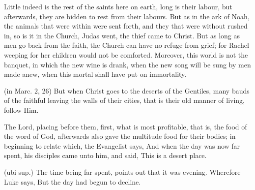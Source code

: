  Little indeed is the rest of the saints here on earth, long is their labour, but afterwards, they are bidden to rest from their labours. But as in the ark of Noah, the animals that were within were sent forth, and they that were without rushed in, so is it in the Church, Judas went, the thief came to Christ. But as long as men go back from the faith, the Church can have no refuge from grief; for Rachel weeping for her children would not be comforted. Moreover, this world is not the banquet, in which the new wine is drank, when the new song will be sung by men made anew, when this mortal shall have put on immortality.

 (in Marc. 2, 26) But when Christ goes to the deserts of the Gentiles, many bauds of the faithful leaving the walls of their cities, that is their old manner of living, follow Him.

 

 The Lord, placing before them, first, what is most profitable, that is, the food of the word of God, afterwards also gave the multitude food for their bodies; in beginning to relate which, the Evangelist says, And when the day was now far spent, his disciples came unto him, and said, This is a desert place.

 (ubi sup.) The time being far spent, points out that it was evening. Wherefore Luke says, But the day had begun to decline.

